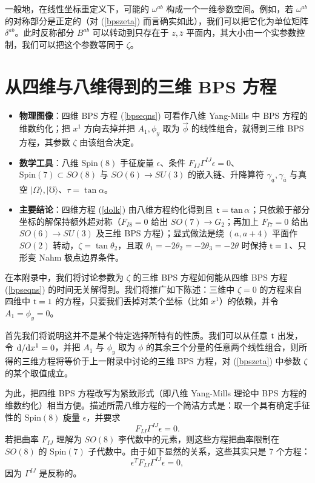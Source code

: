 一般地，在线性坐标重定义下，可能的 $\omega^{ab}$ 构成一个一维参数空间。例如，若 $\omega^{ab}$ 的对称部分是正定的（对 (\ref{bpszeta}) 而言确实如此），我们可以把它化为单位矩阵 $\delta^{ab}$。此时反称部分 $B^{ab}$ 可以转动到只存在于 $z, \bar z$ 平面内，其大小由一个实参数控制，我们可以把这个参数等同于 $\zeta$。

\section{从四维与八维得到的三维 BPS 方程}\label{foureight}

\begin{keytakeaways}
\begin{itemize}\setlength{\itemsep}{2pt}
  \item \textbf{物理图像}：四维 BPS 方程 (\ref{bpseqns}) 可看作八维 Yang-Mills 中 BPS 方程的维数约化；把 $x^1$ 方向去掉并把 $A_1,\phi_y$ 取为 $\vec\phi$ 的线性组合，就得到三维 BPS 方程，其参数 $\zeta$ 由该组合决定。
  \item \textbf{数学工具}：八维 $\mathrm{Spin}(8)$ 手征旋量 $\epsilon$、条件 $F_{IJ}\Gamma^{IJ}\epsilon=0$、$\mathrm{Spin}(7)\subset SO(8)$ 与 $SO(6)\to SU(3)$ 的嵌入链、升降算符 $\gamma_{\underline a},\gamma_{\overline a}$ 与真空 $|\Omega\rangle,|\mho\rangle$、$\tau=\tan\alpha$。
  \item \textbf{主要结论}：四维方程 (\ref{dolk}) 由八维方程约化得到且 ${ \sf t}=\tan\alpha$；只依赖于部分坐标的解保持额外超对称（$F_{I8}=0$ 给出 $SO(7)\to G_2$；再加上 $F_{I7}=0$ 给出 $SO(6)\to SU(3)$ 及三维 BPS 方程）；显式做法是绕 $(a,a+4)$ 平面作 $SO(2)$ 转动，$\zeta=\tan\theta_2$，且取 $\theta_1=-2\theta_2=-2\theta_3=-2\theta$ 时保持 ${ \sf t}=1$、只形变 Nahm 极点边界条件。
\end{itemize}
\end{keytakeaways}

在本附录中，我们将讨论参数为 $\zeta$ 的三维 BPS 方程如何能从四维 BPS 方程 (\ref{bpseqns}) 的时间无关解得到。我们将推广如下陈述：三维中 $\zeta=0$ 的方程来自四维中 ${ \sf t}=1$ 的方程，只要我们丢掉对某个坐标（比如 $x^1$）的依赖，并令 $A_1=\phi_y=0$。

首先我们将说明这并不是某个特定选择所特有的性质。我们可以从任意 ${ \sf t}$ 出发，令 ${\mathrm d}/{\mathrm d} x^1=0$，并把 $A_1$ 与 $\phi_y$ 取为 $\phi$ 的其余三个分量的任意两个线性组合，则所得的三维方程将等价于上一附录中讨论的三维 BPS 方程，对 (\ref{bpszeta}) 中参数 $\zeta$ 的某个取值成立。

为此，把四维 BPS 方程改写为紧致形式（即八维 Yang-Mills 理论中 BPS 方程的维数约化）相当方便。描述所需八维方程的一个简洁方式是：取一个具有确定手征性的 $\mathrm{Spin}(8)$ 旋量 $\epsilon$，并要求
\begin{equation}
F_{IJ} \Gamma^{IJ} \epsilon =0.
\end{equation}
若把曲率 $F_{IJ}$ 理解为 $SO(8)$ 李代数中的元素，则这些方程把曲率限制在 $SO(8)$ 的 $\mathrm{Spin}(7)$ 子代数中。由于如下显然的关系，这些其实只是 7 个方程：
\begin{equation}
\epsilon^T F_{IJ} \Gamma^{IJ} \epsilon =0,
\end{equation}
因为 $\Gamma^{IJ}$ 是反称的。

